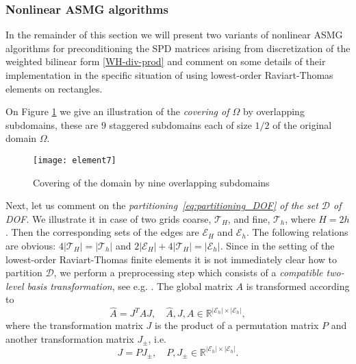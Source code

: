 \documentclass[11pt]{amsart}
\numberwithin{equation}{section}
\theoremstyle{definition}\newtheorem{example}{Example}[section]
\begin{document}
\subsubsection{Nonlinear ASMG algorithms}\label{sec:algorithms}

In the remainder of this section we will present two variants of nonlinear ASMG algorithms
for preconditioning the SPD matrices arising from discretization of the weighted bilinear form
\eqref{WH-div-prod}
and comment on some details of their implementation in the specific situation of using
lowest-order Raviart-Thomas elements on rectangles. 

On Figure \ref{fig:covering} we give an illustration of the {\it covering of ${\Omega}$} by
overlapping subdomains, these are $9$ staggered subdomains each of size $1/2$ of the 
original domain $\Omega$.

\begin{figure}[ht!]
 \texttt{[image: element7]}
\caption{Covering of the domain by nine overlapping subdomains}\label{fig:covering}
\end{figure}

Next, let us comment on the {\it partitioning~\eqref{eq:partitioning_DOF} of
the set $\mathcal{D}$ of DOF}.  We illustrate it in case of two grids 
coarse, ${\mathcal T}_H$, and fine, ${\mathcal T}_h$, where $H=2h$.
Then the corresponding sets of the edges are ${\mathcal E}_H$ and ${\mathcal E}_h$.
The following relations are obvious: $4|{\mathcal T}_H|= |{\mathcal T}_h| $
and $2|{\mathcal E}_H|+ 4|{\mathcal T}_H |= |{\mathcal E}_h| $.
Since in the setting of the lowest-order Raviart-Thomas finite elements it is not immediately
clear how to partition $\mathcal{D}$, we perform a preprocessing step which consists
of a {\it compatible two-level basis transformation}, see e.g. \cite{Kraus_12}. 
The global matrix $A$ is transformed 
according to
\begin{equation}\label{eq:A_hat}
 \widehat{A}=J^T A J, \quad  
\widehat{A}, J,  A  \in {\mathbb{R}}^{ |{\mathcal E}_h| \times  |{\mathcal E}_h| },
\end{equation}
where the transformation matrix $J$ is the product of a permutation matrix $P$ and another 
transformation matrix $J_{\pm}$, i.e.
\begin{equation}\label{eq:transformation_J}
 J=P J_{\pm}, \quad P, J_{\pm} \in {\mathbb{R}}^{ |{\mathcal E}_h| \times  |{\mathcal E}_h| }.
\end{equation}
\end{document}
